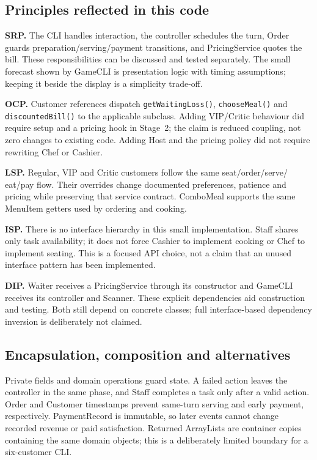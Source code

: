 \subsection{Principles reflected in this code}
\textbf{SRP.} The CLI handles interaction, the controller schedules the turn,
Order guards preparation/serving/payment transitions, and PricingService quotes
the bill. These responsibilities can be discussed and tested separately.
The small forecast shown by GameCLI is presentation logic with timing
assumptions; keeping it beside the display is a simplicity trade-off.

\textbf{OCP.} Customer references dispatch \texttt{getWaitingLoss()},
\texttt{chooseMeal()} and \texttt{discountedBill()} to the applicable subclass.
Adding VIP/Critic behaviour did require setup and a pricing hook in Stage~2;
the claim is reduced coupling, not zero changes to existing code.
Adding Host and the pricing policy did not require rewriting Chef or Cashier.

\textbf{LSP.} Regular, VIP and Critic customers follow the same seat/order/serve/
eat/pay flow. Their overrides change documented preferences, patience and
pricing while preserving that service contract. ComboMeal supports the same
MenuItem getters used by ordering and cooking.

\textbf{ISP.} There is no interface hierarchy in this small implementation.
Staff shares only task availability; it does not force Cashier to implement
cooking or Chef to implement seating. This is a focused API choice, not a
claim that an unused interface pattern has been implemented.

\textbf{DIP.} Waiter receives a PricingService through its constructor and
GameCLI receives its controller and Scanner. These explicit dependencies aid
construction and testing. Both still depend on concrete classes; full
interface-based dependency inversion is deliberately not claimed.

\subsection{Encapsulation, composition and alternatives}
Private fields and domain operations guard state. A failed action leaves the
controller in the same phase, and Staff completes a task only after a valid
action. Order and Customer timestamps prevent same-turn serving and early payment, respectively.
PaymentRecord is immutable, so later events cannot change recorded revenue or
paid satisfaction. Returned ArrayLists are container copies containing the same
domain objects; this is a deliberately limited boundary for a six-customer CLI.

